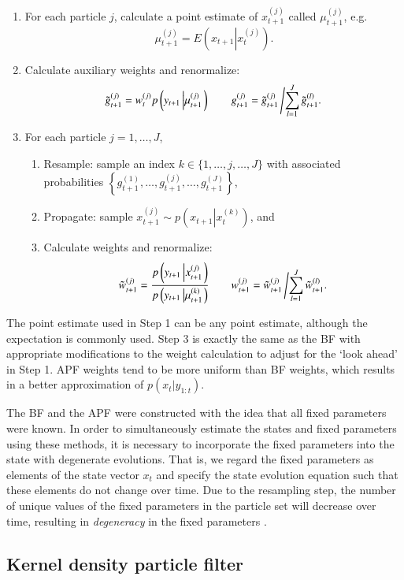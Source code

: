 \documentclass{elsarticle}
\begin{document}
\begin{enumerate}
\item For each particle $j$, calculate a point estimate of $x_{t+1}^{(j)}$ called $\mu_{t+1}^{(j)}$, e.g.
\[ \mu_{t+1}^{(j)} = E\left(x_{t+1}\left|x_t^{(j)} \right.\right). \]
\item Calculate auxiliary weights and renormalize:
\[ \tilde{g}_{t+1}^{(j)} = w_t^{(j)} p\left(y_{t+1}\left|\mu_{t+1}^{(j)}\right.\right) \qquad g_{t+1}^{(j)} = \tilde{g}_{t+1}^{(j)}\left/\sum_{l=1}^J \tilde{g}_{t+1}^{(l)}.\right. \]
\item For each particle $j=1,\ldots,J$,
	\begin{enumerate}
    \item Resample: sample an index $k\in\{1,\ldots,j,\ldots,J\}$ with associated probabilities $\left\{g_{t+1}^{(1)},\ldots,g_{t+1}^{(j)},\ldots,g_{t+1}^{(J)}\right\}$,
	\item Propagate: sample $x_{t+1}^{(j)} \sim p\left(x_{t+1}\left|x_t^{(k)}\right.\right)$, and
	\item Calculate weights and renormalize:
\[ \tilde{w}_{t+1}^{(j)} = \frac{p\left(y_{t+1}\left|x_{t+1}^{(j)}\right.\right)}{p\left(y_{t+1}\left|\mu_{t+1}^{(k)}\right.\right)} \qquad w_{t+1}^{(j)} = \tilde{w}_{t+1}^{(j)}\left/\sum_{l=1}^J \tilde{w}_{t+1}^{(l)}. \right. \]
	\end{enumerate}
\end{enumerate}

\noindent The point estimate used in Step 1 can be any point estimate, although the expectation is commonly used. Step 3 is exactly the same as the BF with appropriate modifications to the weight calculation to adjust for the `look ahead' in Step 1. APF weights tend to be more uniform than BF weights, which results in a better approximation of $p(x_{t}|y_{1:t})$.

The BF and the APF were constructed with the idea that all fixed parameters were known. In order to simultaneously estimate the states and fixed parameters using these methods, it is necessary to incorporate the fixed parameters into the state with degenerate evolutions. That is, we regard the fixed parameters as elements of the state vector $x_t$ and specify the state evolution equation such that these elements do not change over time. Due to the resampling step, the number of unique values of the fixed parameters in the particle set will decrease over time, resulting in \emph{degeneracy} in the fixed parameters \citep{Liu:West:comb:2001}.

\subsection{Kernel density particle filter \label{sec:kd}}
\end{document}
